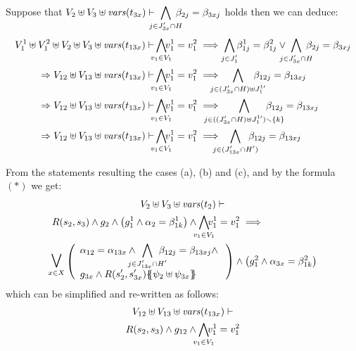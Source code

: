 \documentclass[runningheads]{llncs}
\begin{document}
\begin{enumerate}
\begin{enumerate}
Suppose that  $V_{2} \uplus V_{3} \uplus \fvars{t_{3x}}  \vdash {\displaystyle \bigwedge_\subbox{j \in J'_{3x} \cap H} \beta_{2j} = \beta_{3xj}}$ holds then we can deduce:
\begin{align*}
V^1_{1} \uplus V^2_{1} \uplus V_{2} \uplus V_{3} \uplus \fvars{t_{13x}}
\vdash &   \bigwedge_\subbox{v_1\in V_1}\!\! v^1_1=v^2_1\implies \bigwedge_\subbox{j \in J^{\prime}_1} \beta^1_{1j}= \beta^2_{1j} \vee  
\bigwedge_\subbox{j \in J'_{3x} \cap H} \beta_{2j} = \beta_{3xj}\\
\Rightarrow  V_{12} \uplus V_{13}  \uplus \fvars{t_{13x}}\vdash & 
\bigwedge_\subbox{v_1\in V_1}\!\! v^1_1=v^2_1
\implies {\displaystyle \bigwedge_\subbox{j \in (J'_{3x}   \cap H)\uplus J^{1 \prime}_1 } \beta_{12j} = \beta_{13xj}} \\  
\Rightarrow   V_{12} \uplus V_{13}  \uplus \fvars{t_{13x}} \vdash & 
\bigwedge_\subbox{v_1\in V_1}\!\! v^1_1=v^2_1
\implies 
{\displaystyle \bigwedge_\subbox{j \in ((J'_{3x}   \cap H)\uplus J^{1 \prime}_1)\setminus \{k\} } \beta_{12j} = \beta_{13xj}}\\
\Rightarrow  V_{12} \uplus V_{13}  \uplus \fvars{t_{13x}} \vdash & 
\bigwedge_\subbox{v_1\in V_1}\!\! v^1_1=v^2_1
\implies 
{\displaystyle \bigwedge_\subbox{j \in (J'_{13x}   \cap H')} \beta_{12j} = \beta_{13xj}}
\end{align*}
\end{enumerate}
From the statements resulting the cases (a), (b) and (c),  and by  the formula $(*)$ we get:
\begin{multline*}
V_2 \uplus V_3 \uplus \fvars{t_2} \vdash\\ R\mpar{s_2, s_3} \wedge g_2 \wedge  \mpar{g^1_1  \wedge \alpha_2=\beta^1_{1k}} \wedge \bigwedge_\subbox{v_1\in V_1}\!\! v^1_1=v^2_1
\implies\hspace{5em}\\ \operatorname*{\bigsymb{\bigvee}}_{x \in X} \mpar{\everymath{\displaystyle}
\begin{array}{l}
			\alpha_{12} = \alpha_{13x} \wedge \bigwedge_\subbox{j \in J'_{13x} \cap H'} \beta_{12j} = \beta_{13xj} \nwedge\\
			 g_{3x} \wedge R\mpar{s'_2, s'_{3x}}\psubst{\psi_2 \uplus \psi_{3x}}
		\end{array}} \wedge    \mpar{g^2_1  \wedge \alpha_{3x}=\beta^2_{1k}}
\end{multline*}	
which can be simplified and re-written as follows:
\begin{multline*}
V_{12} \uplus V_{13} \uplus \fvars{t_{13x}} \vdash\\ R\mpar{s_2, s_3} \wedge g_{12} \wedge \bigwedge_\subbox{v_1\in V_1}\!\! v^1_1=v^2_1

\end{multline*}
\end{enumerate}
\end{document}

